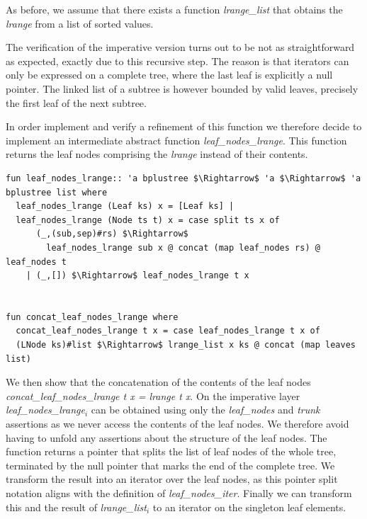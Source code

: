 \documentclass[runningheads]{llncs}
\begin{document}
As before, we assume that there exists a function \textit{lrange\_list} that
obtains the \emph{lrange} from a list of sorted values.

The verification of the imperative version turns out to be not as straightforward
as expected, exactly due to this recursive step.
The reason is that iterators can only be expressed on a complete tree,
where the last leaf is explicitly a null pointer.
The linked list of a subtree is however bounded by valid leaves,
precisely the first leaf of the next subtree.

In order implement and verify a refinement of this function we therefore decide
to implement an intermediate abstract function \emph{leaf\_nodes\_lrange}.
This function returns the leaf nodes comprising the \emph{lrange} instead of their contents.

\begin{minipage}{\linewidth}
\begin{lstlisting}[mathescape=true, language=Isabelle,label=lst:btree-leaves-range]
fun leaf_nodes_lrange:: 'a bplustree $\Rightarrow$ 'a $\Rightarrow$ 'a bplustree list where
  leaf_nodes_lrange (Leaf ks) x = [Leaf ks] |
  leaf_nodes_lrange (Node ts t) x = case split ts x of
      (_,(sub,sep)#rs) $\Rightarrow$ 
        leaf_nodes_lrange sub x @ concat (map leaf_nodes rs) @ leaf_nodes t
    | (_,[]) $\Rightarrow$ leaf_nodes_lrange t x
  

fun concat_leaf_nodes_lrange where
  concat_leaf_nodes_lrange t x = case leaf_nodes_lrange t x of
  (LNode ks)#list $\Rightarrow$ lrange_list x ks @ concat (map leaves list)
\end{lstlisting}
\end{minipage}

We then show that the concatenation of the contents of the leaf nodes
\emph{concat\_leaf\_nodes\_lrange t x = lrange t x}.
On the imperative layer \emph{leaf\_nodes\_lrange$_i$}
can be obtained using only the \emph{leaf\_nodes} and \emph{trunk}
assertions as we never access the contents of the leaf nodes.
We therefore avoid having to unfold any assertions about the structure of the leaf nodes.
The function returns a pointer that splits the list of leaf nodes of the whole tree,
terminated by the null pointer that marks the end of the complete tree.
We transform the result into an iterator over the leaf nodes,
as this pointer split notation aligns with the definition of \emph{leaf\_nodes\_iter}.
Finally we can transform this and the result of \emph{lrange\_list$_i$} to
an iterator on the singleton leaf elements.
\end{document}
